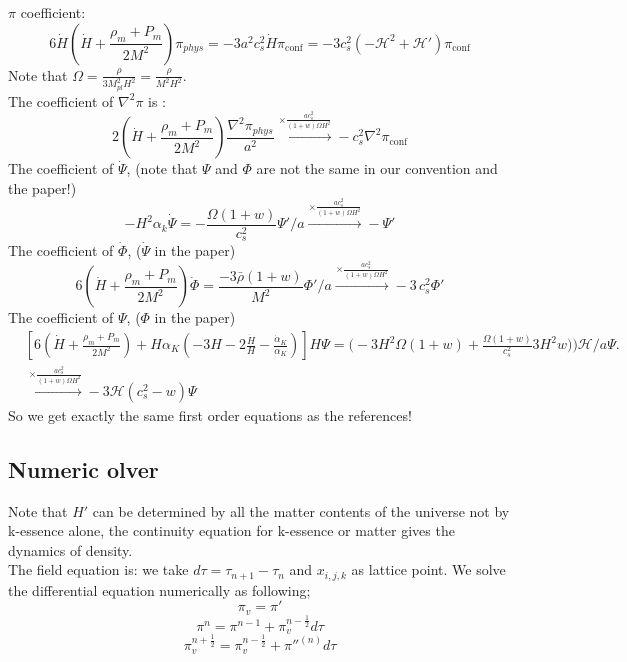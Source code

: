 \documentclass[a4paper,11pt]{article}
\def\be{\begin{equation}}
\def\ee{\end{equation}}
\begin{document}
$\pi$ coefficient:
\be
6 \dot{H}(\dot{H} + \frac{\rho_m + P_m}{2M^2}) \pi_{phys} = -3 a^2 c_s^2 \dot{H} \pi_{\text{conf}} = -3 c_s^2(-\mathcal{H}^2 + \mathcal{H}') \pi_{\text{conf}}
\ee
Note that $\Omega= \frac{\rho}{3 M_{pl}^2 H^2}=  \frac{\rho}{M^2 H^2}$. \\
The coefficient of $\nabla^2 \pi$ is :
\be
2 (\dot{H} + \frac{\rho_m + P_m}{2M^2}) \frac{\nabla^2 \pi_{phys}}{a^2} \xrightarrow{  \times \frac{ ac_s^2}{(1+w) \Omega H^2}} -c_s^2  \nabla^2 \pi_{\text{conf}}
\ee
The coefficient of $\dot{\Psi}$, (note that $\Psi$ and $\Phi$ are not the same in our convention and the paper!)
\be
- H^2 \alpha_k \dot{\Psi} = -\frac{\Omega (1+w) }{c_s^2} \Psi'/a \xrightarrow{  \times \frac{ ac_s^2}{(1+w) \Omega H^2}} -\Psi'
\ee
The coefficient of $\dot{\Phi}$, ($\dot{\Psi}$ in the paper)
\be
6(\dot{H} + \frac{\rho_m + P_m}{2M^2}) \dot{\Phi} = \frac{ -3 \bar{\rho}(1+w)}{M^2}  {\Phi'}/a\xrightarrow{  \times \frac{ ac_s^2}{(1+w) \Omega H^2}}  -3 \, c_s^2 \Phi'
\ee
The coefficient of ${\Psi}$, (${\Phi}$ in the paper)
\begin{align}
 & \left [ 6(\dot{H} + \frac{\rho_m + P_m}{2M^2}) + H \alpha_K \left ( -3  H -2 \frac{\dot{H}}{H} - \frac{\dot{\alpha}_K}{\alpha_K } \right ) \right ] H \Psi= \Big( -3 H^2 \Omega (1+w) + \frac{\Omega (1+w)}{c_s^2} 3 H^2 w)\Big ) \mathcal{H}/a  \Psi \nonumber. \\ &
 \xrightarrow{  \times \frac{ ac_s^2}{(1+w) \Omega H^2}} -3 \mathcal{H} (c_s^2 -w )\Psi
\end{align}
So we get exactly the same first order equations as the references! \\
\subsection{Numeric olver}
Note that ${H'}$ can be determined by all the matter contents of the universe not by k-essence alone, the continuity equation for k-essence or matter gives the dynamics of density. \\
The field equation is:
we take $d \tau=\tau_{n+1}-\tau_n $ and $x_{i,j,k} $ as lattice point. We solve the differential equation numerically as following;
\be
\pi_v= {\pi}'
\ee
\be
\pi^{n}= \pi ^{n-1}+\pi_v ^{n-\frac{1}{2}} d \tau
\ee
\be \label{eq3}
\pi_v ^{n+\frac{1}{2}}=\pi_v ^{n-\frac{1}{2}} + {\pi''} ^{(n)}  d \tau
\ee
\end{document}
